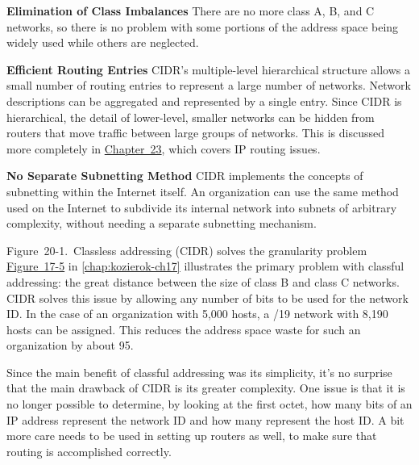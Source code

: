 \documentclass[b5paper,11pt]{memoir}
\begin{document}
{\textbf{Elimination of Class Imbalances}} There are no more class A, B,
and C networks, so there is no problem with some portions of the address
space being widely used while others are neglected.

{\textbf{Efficient Routing Entries}} CIDR's multiple-level hierarchical
structure allows a small number of routing entries to represent a large
number of networks. Network descriptions can be aggregated and
represented by a single entry. Since CIDR is hierarchical, the detail of
lower-level, smaller networks can be hidden from routers that move
traffic between large groups of networks. This is discussed more
completely in \protect\hyperlink{ch23.html}{Chapter~23}, which covers IP
routing issues.

{\textbf{No Separate Subnetting Method}} CIDR implements the concepts of
subnetting within the Internet itself. An organization can use the same
method used on the Internet to subdivide its internal network into
subnets of arbitrary complexity, without needing a separate subnetting
mechanism.

\protect\hypertarget{ch20.htmlux5cux23classless_addressing_cidr_solves_the_gra}{}{}

\protect\hypertarget{ch20.htmlux5cux23I_mediaobject6_d1e21463}{}{}

Figure~20-1.~Classless addressing (CIDR) solves the granularity problem
\protect\hyperlink{ch17s07.htmlux5cux23the_main_problem_with_classful_addressin}{Figure~17-5}
in \vref{chap:kozierok-ch17} illustrates the primary
problem with classful addressing: the great distance between the size of
class B and class C networks. CIDR solves this issue by allowing any
number of bits to be used for the network ID. In the case of an
organization with 5,000 hosts, a /19 network with 8,190 hosts can be
assigned. This reduces the address space waste for such an organization
by about 95.

Since the main benefit of classful addressing was its simplicity, it's
no surprise that the main drawback of CIDR is its greater complexity.
One issue is that it is no longer possible to determine, by looking at
the first octet, how many bits of an IP address represent the network ID
and how many represent the host ID. A bit more care needs to be used in
setting up routers as well, to make sure that routing is accomplished
correctly.

\protect\hypertarget{ch20s02.html}{}{}
\end{document}
